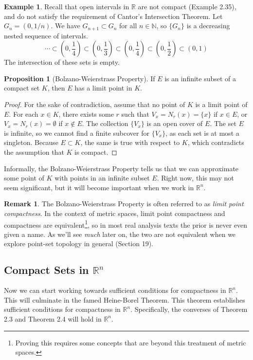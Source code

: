 \documentclass{article}
\newcommand{\N}{\mathbb{N}}
\newcommand{\R}{\mathbb{R}}
\theoremstyle{definition}
\newtheorem{proposition}{Proposition}[section]
\newtheorem{example}{Example}[section]
\newtheorem{remark}{Remark}[section]
\begin{document}
\begin{example}
	Recall that open intervals in $ \R $ are not compact (Example 2.35), and do not satisfy the requirement of Cantor's Intersection Theorem. Let $ G_{n}=(0,1/n) $. We have $ G_{n+1}\subset G_{n} $ for all $ n\in\N $, so $ \{G_n\} $ is a decreasing nested sequence of intervals. $$ \cdots\subset \left(0,\frac{1}{4}\right)\subset\left(0,\frac{1}{3}\right)\subset\left(0,\frac{1}{4}\right)\subset\left(0,\frac{1}{2}\right)\subset(0,1)$$  
The intersection of these sets is empty.	
\end{example}
\begin{proposition}[Bolzano-Weierstrass Property]
	If $ E $ is an infinite subset of a compact set $ K $, then $ E $ has a limit point in $ K $. 
\end{proposition}
\begin{proof}
	For the sake of contradiction, assume that no point of $ K $ is a limit point of $ E $. For each $ x\in K $, there exists some $ r $ such that $ V_x=N_r(x)=\{x\}  $ if $ x\in E $, or $ V_x=N_r(x)=\emptyset $ if $ x\notin E $. The collection $ \{V_x\} $ is an open cover of $ E $. The set $ E $ is infinite, so we cannot find a finite subcover for $ \{V_x\} $, as each set is at most a singleton. Because $ E\subset K $, the same is true with respect to $ K $, which contradicts the assumption that $ K $ is compact. 
\end{proof}
Informally, the Bolzano-Weierstrass Property tells us that we can approximate some point of $ K $ with points in an infinite subset $ E $. Right now, this may not seem significant, but it will become important when we work in $ \R^n $. 
\begin{remark}
	The Bolzano-Weierstrass Property is often referred to as \textit{\color{red}limit point compactness}. In the context of metric spaces, limit point compactness and compactness are equivalent\footnote{Proving this requires some concepts that are beyond this treatment of metric spaces.}, so in most real analysis texts the prior is never even given a name. As we'll see \textit{much} later on, the two are not equivalent when we explore point-set topology in general (Section 19).   
\end{remark} 
\subsection{Compact Sets in $ \R^n $}
Now we can start working towards sufficient conditions for compactness in $ \R^n $. This will culminate in the famed Heine-Borel Theorem. This theorem establishes sufficient conditions for compactness in $ \R^n $. Specifically, the converses of Theorem 2.3 and Theorem 2.4 will hold in $ \R^n $.  
\end{document}
